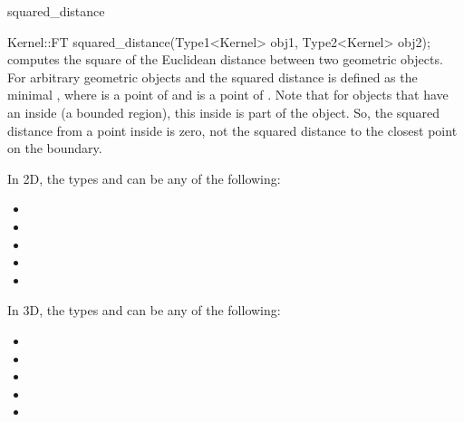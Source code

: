 \begin{ccRefFunction}{squared_distance}
\\

{Kernel::FT squared_distance(Type1<Kernel> obj1, Type2<Kernel> obj2);}
{computes the square of the Euclidean distance between two geometric objects. 
For arbitrary geometric objects  and
 the squared distance is defined as the minimal
, where  is a point of
 and  is a point of .
Note that for objects that have an inside (a bounded region), this inside 
is part of the object. So, the squared distance from a point inside is 
zero, not the squared distance to the closest point on the boundary.}

In 2D, the types  and  can be any of the
following:
\begin{itemize}
\item {}
\item {}
\item {}
\item {}
\item {}
\end{itemize}

In 3D, the types  and  can be any of the
following:
\begin{itemize}
\item {}
\item {}
\item {}
\item {}
\item {}
\end{itemize}

\ccSeeAlso
{} \\
 \\
 \\
 \\
 \\
 \\
 \\
\\
 \\

\end{ccRefFunction}
